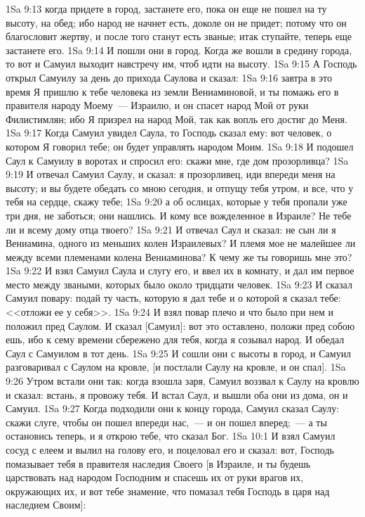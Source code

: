 \vs 1Sa 9:13 когда придете в город, застанете его, пока он еще не пошел на ту высоту, на обед; ибо народ не начнет есть, доколе он не придет; потому что он благословит жертву, и после того станут есть званые; итак ступайте, теперь еще застанете его.
\vs 1Sa 9:14 И пошли они в город. Когда же вошли в средину города, то вот и Самуил выходит навстречу им, чтоб идти на высоту.
\vs 1Sa 9:15 А Господь открыл Самуилу за день до прихода Саулова и сказал:
\vs 1Sa 9:16 завтра в это время Я пришлю к тебе человека из земли Вениаминовой, и ты помажь его в правителя народу Моему~--- Израилю, и он спасет народ Мой от руки Филистимлян; ибо Я призрел на народ Мой, так как вопль его достиг до Меня.
\vs 1Sa 9:17 Когда Самуил увидел Саула, то Господь сказал ему: вот человек, о котором Я говорил тебе; он будет управлять народом Моим.
\vs 1Sa 9:18 И подошел Саул к Самуилу в воротах и спросил его: скажи мне, где дом прозорливца?
\vs 1Sa 9:19 И отвечал Самуил Саулу, и сказал: я прозорливец, иди впереди меня на высоту; и вы будете обедать со мною сегодня, и отпущу тебя утром, и все, что у тебя на сердце, скажу тебе;
\vs 1Sa 9:20 а об ослицах, которые у тебя пропали уже три дня, не заботься; они нашлись. И кому все вожделенное в Израиле? Не тебе ли и всему дому отца твоего?
\vs 1Sa 9:21 И отвечал Саул и сказал: не сын ли я Вениамина, одного из меньших колен Израилевых? И племя мое не малейшее ли между всеми племенами колена Вениаминова? К чему же ты говоришь мне это?
\vs 1Sa 9:22 И взял Самуил Саула и слугу его, и ввел их в комнату, и дал им первое место между зваными, которых было около тридцати человек.
\vs 1Sa 9:23 И сказал Самуил повару: подай ту часть, которую я дал тебе и о которой я сказал тебе: <<отложи ее у себя>>.
\vs 1Sa 9:24 И взял повар плечо и что было при нем и положил пред Саулом. И сказал [Самуил]: вот это оставлено, положи пред собою  ешь, ибо к сему времени сбережено  для тебя, когда я созывал народ. И обедал Саул с Самуилом в тот день.
\vs 1Sa 9:25 И сошли они с высоты в город, и Самуил разговаривал с Саулом на кровле, [и постлали Саулу на кровле, и он спал].
\vs 1Sa 9:26 Утром встали они так: когда взошла заря, Самуил воззвал к Саулу на кровлю и сказал: встань, я провожу тебя. И встал Саул, и вышли оба они из дома, он и Самуил.
\vs 1Sa 9:27 Когда подходили они к концу города, Самуил сказал Саулу: скажи слуге, чтобы он пошел впереди нас,~--- и он пошел вперед;~--- а ты остановись теперь, и я открою тебе, что сказал Бог.
\vs 1Sa 10:1 И взял Самуил сосуд с елеем и вылил на голову его, и поцеловал его и сказал: вот, Господь помазывает тебя в правителя наследия Своего [в Израиле, и ты будешь царствовать над народом Господним и спасешь их от руки врагов их, окружающих их, и вот тебе знамение, что помазал тебя Господь в царя над наследием Своим]:
